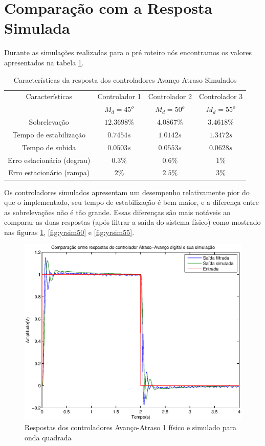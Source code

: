 \documentclass{article}
\begin{document}
\section{Comparação com a Resposta Simulada}
Durante as simulações realizadas para o pré roteiro \cite{bb:prelab5} nós encontramos os valores apresentados na tabela \ref{tab:avatsim}.\\
\begin{table}[H]
	\centering
	\caption{Características da resposta dos controladores Avanço-Atraso Simulados}
	\label{tab:avatsim}
	\begin{tabular}{|c|c|c|c|}
		\hline Características & Controlador 1& Controlador 2& Controlador 3 \\ 
		&$M_d = 45^o$&$M_d = 50^o$&$M_d = 55^o$\\
		\hline Sobrelevação & $12.3698\%$ & $4.0867\%$ & $3.4618\%$\\ 
		\hline Tempo de estabilização & $0.7454s$ & $1.0142s$ & $1.3472s$\\ 
		\hline Tempo de subida & $0.0503s$ & $0.0553s$ & $0.0628s$\\ 
		\hline Erro estacionário (degrau) & $0.3\%$ & $0.6\%$ & $1\%$\\ 
		\hline Erro estacionário (rampa) & $2\%$ & $2.5\%$ & $3\%$\\ 
		\hline 
	\end{tabular} 
\end{table}
Os controladores simulados apresentam um desempenho relativamente pior do que o implementado, seu tempo de estabilização é bem maior, e a diferença entre as sobrelevações não é tão grande. Essas diferenças são mais notáveis ao comparar as duas respostas (após filtrar a saída do sistema físico) como mostrado nas figuras \ref{fig:yrsim45}, \ref{fig:yrsim50} e \ref{fig:yrsim55}.
\begin{figure}[H]
	\centering
	\includegraphics[width=0.8\linewidth]{yrsim45}
	\caption{Respostas dos controladores Avanço-Atraso 1 físico e simulado para onda quadrada}
	\label{fig:yrsim45}
\end{figure}
\end{document}
